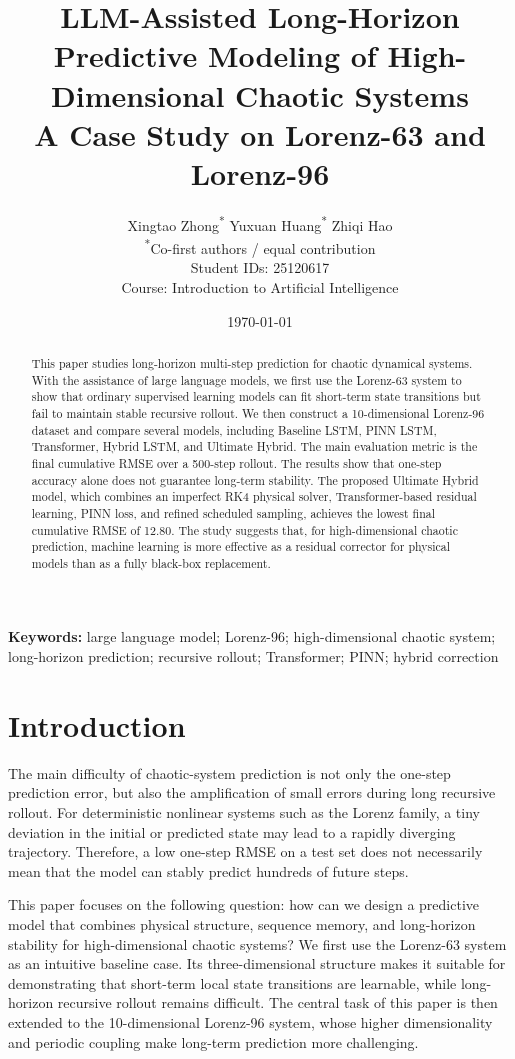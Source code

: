 \documentclass[a4paper,12pt]{article}
\title{\textbf{LLM-Assisted Long-Horizon Predictive Modeling of High-Dimensional Chaotic Systems}\\
\large A Case Study on Lorenz-63 and Lorenz-96}
\author{Xingtao Zhong\textsuperscript{*} \quad Yuxuan Huang\textsuperscript{*} \quad Zhiqi Hao\\
\textsuperscript{*}Co-first authors / equal contribution\\
Student IDs: 25120617 \quad 25120619 \quad 25120621\\
Course: Introduction to Artificial Intelligence}
\date{\today}
\begin{document}
\maketitle
\thispagestyle{empty}

\begin{abstract}
This paper studies long-horizon multi-step prediction for chaotic dynamical systems. With the assistance of large language models, we first use the Lorenz-63 system to show that ordinary supervised learning models can fit short-term state transitions but fail to maintain stable recursive rollout. We then construct a 10-dimensional Lorenz-96 dataset and compare several models, including Baseline LSTM, PINN LSTM, Transformer, Hybrid LSTM, and Ultimate Hybrid. The main evaluation metric is the final cumulative RMSE over a 500-step rollout. The results show that one-step accuracy alone does not guarantee long-term stability. The proposed Ultimate Hybrid model, which combines an imperfect RK4 physical solver, Transformer-based residual learning, PINN loss, and refined scheduled sampling, achieves the lowest final cumulative RMSE of 12.80. The study suggests that, for high-dimensional chaotic prediction, machine learning is more effective as a residual corrector for physical models than as a fully black-box replacement.
\end{abstract}

\noindent\textbf{Keywords:} large language model; Lorenz-96; high-dimensional chaotic system; long-horizon prediction; recursive rollout; Transformer; PINN; hybrid correction

\newpage
\tableofcontents
\newpage

\section{Introduction}

The main difficulty of chaotic-system prediction is not only the one-step prediction error, but also the amplification of small errors during long recursive rollout. For deterministic nonlinear systems such as the Lorenz family, a tiny deviation in the initial or predicted state may lead to a rapidly diverging trajectory. Therefore, a low one-step RMSE on a test set does not necessarily mean that the model can stably predict hundreds of future steps.

This paper focuses on the following question: how can we design a predictive model that combines physical structure, sequence memory, and long-horizon stability for high-dimensional chaotic systems? We first use the Lorenz-63 system as an intuitive baseline case. Its three-dimensional structure makes it suitable for demonstrating that short-term local state transitions are learnable, while long-horizon recursive rollout remains difficult. The central task of this paper is then extended to the 10-dimensional Lorenz-96 system, whose higher dimensionality and periodic coupling make long-term prediction more challenging.
\end{document}
